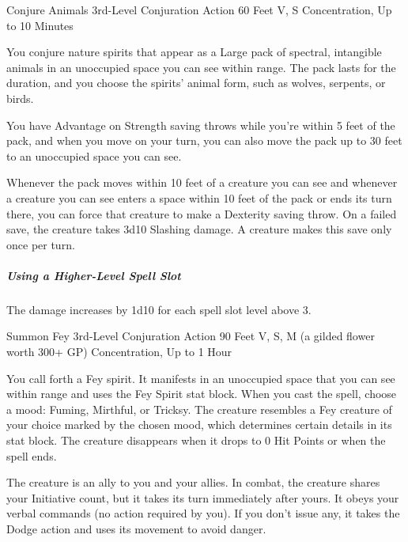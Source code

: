 \documentclass[letterpaper,openany,oneside,twocolumn]{book}
\begin{document}
\DndSpellHeader
  {Conjure Animals}
  {3rd-Level Conjuration}
  {Action}
  {60 Feet}
  {V, S}
  {Concentration, Up to 10 Minutes}

You conjure nature spirits that appear as a Large pack of spectral, intangible animals in an unoccupied space you can see within range. The pack lasts for the duration, and you choose the spirits' animal form, such as wolves, serpents, or birds.

You have Advantage on Strength saving throws while you're within 5 feet of the pack, and when you move on your turn, you can also move the pack up to 30 feet to an unoccupied space you can see.

Whenever the pack moves within 10 feet of a creature you can see and whenever a creature you can see enters a space within 10 feet of the pack or ends its turn there, you can force that creature to make a Dexterity saving throw. On a failed save, the creature takes 3d10 Slashing damage. A creature makes this save only once per turn.

\subparagraph*{Using a Higher-Level Spell Slot} The damage increases by 1d10 for each spell slot level above 3.

\DndSpellHeader
  {Summon Fey}
  {3rd-Level Conjuration}
  {Action}
  {90 Feet}
  {V, S, M (a gilded flower worth 300+ GP)}
  {Concentration, Up to 1 Hour}
  
You call forth a Fey spirit. It manifests in an unoccupied space that you can see within range and uses the Fey Spirit stat block. When you cast the spell, choose a mood: Fuming, Mirthful, or Tricksy. The creature resembles a Fey creature of your choice marked by the chosen mood, which determines certain details in its stat block. The creature disappears when it drops to 0 Hit Points or when the spell ends.

The creature is an ally to you and your allies. In combat, the creature shares your Initiative count, but it takes its turn immediately after yours. It obeys your verbal commands (no action required by you). If you don't issue any, it takes the Dodge action and uses its movement to avoid danger.
\end{document}
